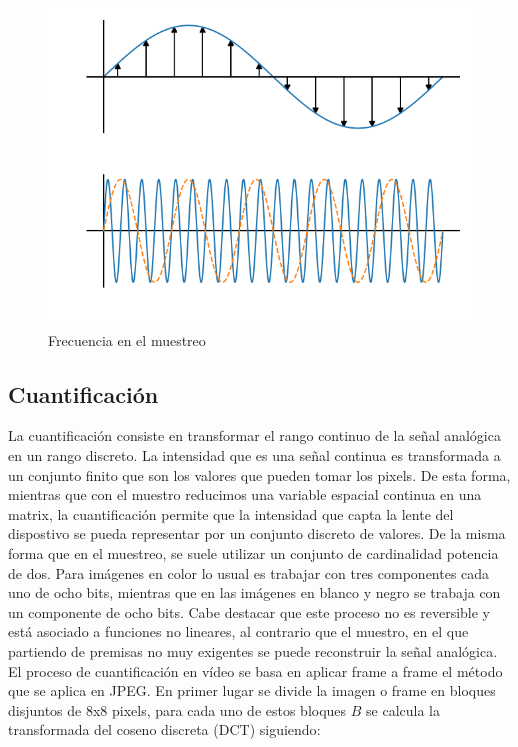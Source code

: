 \begin{figure}[ht!]
\begin{center}
\includegraphics{figuras/nyquist.png}
\end{center}
\caption{Frecuencia en el muestreo}
\label{fig_nyquist}
\end{figure}

\subsection{Cuantificación}
La cuantificación consiste en transformar el rango continuo de la se\~nal analógica en un rango discreto. La intensidad que es una se\~nal continua es transformada a un conjunto finito que son los valores que pueden tomar los pixels. De esta forma, mientras que con el muestro reducimos una variable espacial continua en una matrix, la cuantificación permite que la intensidad que capta la lente del dispostivo se pueda representar por un conjunto discreto de valores. 
De la misma forma que en el muestreo, se suele utilizar un conjunto de cardinalidad potencia de dos. Para imágenes en color lo usual es trabajar con tres componentes cada uno de ocho bits, mientras que en las imágenes en blanco y negro se trabaja con un componente de ocho bits. 
Cabe destacar que este proceso no es reversible y está asociado a funciones no lineares, al contrario que el muestro, en el que partiendo de premisas no muy exigentes se puede reconstruir la se\~nal analógica. \\

El proceso de cuantificación en vídeo se basa en aplicar frame a frame el método que se aplica en JPEG. En primer lugar se divide la imagen o frame en bloques disjuntos de $8$x$8$ pixels, para cada uno de estos bloques $B$ se calcula la transformada del coseno discreta (DCT) siguiendo\cite{fridrich:2003}:

